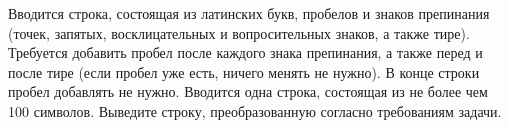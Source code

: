 Вводится строка, состоящая из латинских букв, пробелов и знаков препинания (точек, запятых, 
восклицательных и вопросительных знаков, а также тире). Требуется добавить пробел после каждого 
знака препинания, а также перед и после тире (если пробел уже есть, ничего менять не нужно).
В конце строки пробел добавлять не нужно.
\InputFile
Вводится одна строка, состоящая из не более чем 100 символов.
\OutputFile
Выведите строку, преобразованную согласно требованиям задачи.

